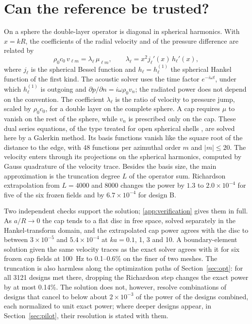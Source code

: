 \documentclass[preprint,12pt]{elsarticle}
\begin{document}
\section{Can the reference be trusted?}
\label{sec:reference}
On a sphere the double-layer operator is diagonal in spherical harmonics. With $x=kR$, the coefficients of the radial velocity and of the pressure difference are related by
\begin{equation}
 \rho_0c_0\,v_{\ell m}=\lambda_\ell\,\mu_{\ell m},\qquad \lambda_\ell=x^2j_\ell'(x)\,h_\ell'(x),
 \label{eq:lambda}
\end{equation}
where $j_\ell$ is the spherical Bessel function and $h_\ell=h_\ell^{(1)}$ the spherical Hankel function of the first kind. The acoustic solver uses the time factor $e^{-i\omega t}$, under which $h_\ell^{(1)}$ is outgoing and $\partial p/\partial n=i\omega\rho_0v_n$; the radiated power does not depend on the convention. The coefficient $\lambda_\ell$ is the ratio of velocity to pressure jump, scaled by $\rho_0c_0$, for a double layer on the complete sphere. %
A cap requires $\mu$ to vanish on the rest of the sphere, while $v_n$ is prescribed only on the cap. These dual series equations, of the type treated for open spherical shells \cite{Vinogradov1978,VinogradovPartI2001}, are solved here by a Galerkin method. Its basis functions vanish like the square root of the distance to the edge, with 48 functions per azimuthal order $m$ and $|m|\le20$. %
The velocity enters through its projections on the spherical harmonics, computed by Gauss quadrature of the velocity trace. Besides the basis size, the main approximation is the truncation degree $L$ of the operator sum. Richardson extrapolation from $L=4000$ and 8000 changes the power by $1.3$ to $2.0\times10^{-4}$ for five of the six frozen fields and by $6.7\times10^{-4}$ for design B. %

Two independent checks support the solution; \ref{app:verification} gives them in full. As $a/R\to0$ the cap tends to a flat disc in free space, solved separately in the Hankel-transform domain, and the extrapolated cap power agrees with the disc to between $3\times10^{-5}$ and $5.4\times10^{-4}$ at $ka=0.1$, 1, 3 and 10. %
A boundary-element solution given the same velocity traces as the exact solver agrees with it for six frozen cap fields at 100~Hz to 0.1--0.6\% on the finer of two meshes. %
The truncation is also harmless along the optimization paths of Section~\ref{sec:opt}: for all 3121 designs met there, dropping the Richardson step changes the exact power by at most 0.14\%. %
The solution does not, however, resolve combinations of designs that cancel to below about $2\times10^{-3}$ of the power of the designs combined, each normalized to unit exact power; where deeper designs appear, in Section~\ref{sec:pilot}, their resolution is stated with them. %
\end{document}
